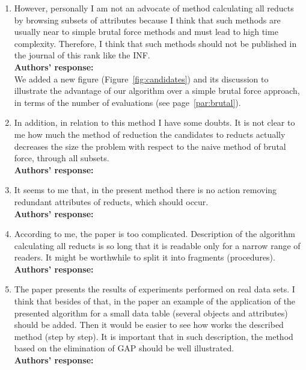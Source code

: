 \documentclass{letter}
\begin{document}
\begin{letter}{}
  \begin{enumerate}
    \item However, personally I am not  an advocate of method calculating all reducts by browsing subsets of attributes because I think that such methods are usually near to simple brutal force methods and must lead to high time complexity. Therefore, I think that such methods should not be published in the journal of this rank like the INF.\\
    \textbf{Authors’ response:} \\
    We added a new figure (Figure~\ref{fig:candidates}) and its discussion to illustrate the advantage of our algorithm over a simple brutal force approach, in terms of the number of evaluations (see page~\ref{par:brutal}).
    
    \item In addition, in relation to this method I have some doubts. It is not clear to me how much the method of reduction the candidates to reducts actually decreases the size the problem with respect to the naive method of brutal force, through all subsets.\\
    \textbf{Authors’ response:} 

    \item It seems to me that, in the present method there is no action removing redundant attributes of reducts, which should occur.\\
    \textbf{Authors’ response:} 

	\item According to me, the paper is too complicated. Description of the algorithm calculating all reducts is so long that it is readable only for a narrow range of readers. It might be worthwhile to split it into fragments (procedures).\\
	\textbf{Authors’ response:} 

	\item The paper presents the results of experiments performed on real data sets. I think that besides of that, in the paper an example of the application of the presented algorithm for a small data table (several objects and attributes) should be added. Then it would be easier to see how works the described method (step by step). It is important that in such description, the method based on the elimination of GAP should be well illustrated.\\
	\textbf{Authors’ response:} 
  \end{enumerate}    
  
  

\end{letter}
\end{document}
